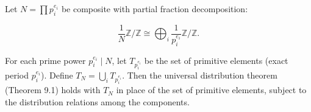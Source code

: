 Let $N = \prod p_i^{e_i}$ be composite with partial fraction decomposition:

$$\frac{1}{N}\mathbb{Z}/\mathbb{Z} \cong \bigoplus_i \frac{1}{p_i^{e_i}}\mathbb{Z}/\mathbb{Z}.$$

For each prime power $p_i^{e_i} \mid N$, let $T_{p_i^{e_i}}$ be the set of primitive
elements (exact period $p_i^{e_i}$). Define $T_N = \bigcup_i T_{p_i^{e_i}}$.
Then the universal distribution theorem (Theorem 9.1) holds with $T_N$ in place of the
set of primitive elements, subject to the distribution relations among the components.
